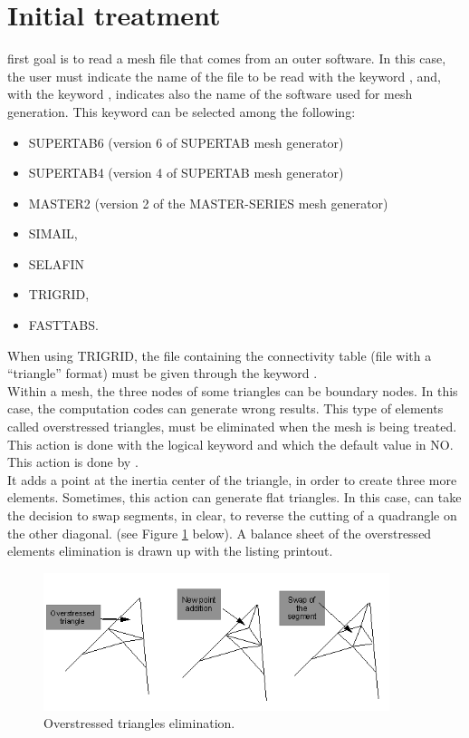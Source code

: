 \section{Initial treatment}
\stbtel first goal is to read a mesh file that comes from an outer software. In
this case, the user must indicate the name of the file to be read with the
keyword , and, with the keyword ,
indicates also the name of the software used for mesh generation. This keyword
can be selected among the following:
\begin{itemize}
\item SUPERTAB6 (version 6 of  SUPERTAB mesh generator)
\item SUPERTAB4 (version 4 of  SUPERTAB mesh generator)
\item MASTER2 (version 2 of the MASTER-SERIES mesh generator)
\item SIMAIL,
\item SELAFIN
\item TRIGRID,
\item FASTTABS.
\end{itemize}
When using TRIGRID, the file containing the connectivity table (file with a
“triangle” format) must be given through the keyword .\\
Within a mesh, the three nodes of some triangles can be boundary nodes. In this
case, the computation codes can generate wrong results. This type of elements
called overstressed triangles, must be eliminated when the mesh is being
treated. This action is done with the logical keyword  and which the default value in NO. This action is done
by \stbtel.\\
It adds a point at the inertia center of the triangle, in order to
create three more elements. Sometimes, this action can generate flat triangles.
In this case, \stbtel can take the decision to swap segments, in clear, to
reverse the cutting of a quadrangle on the other diagonal. (see Figure
\ref{fig:stress} below). A balance sheet of the overstressed elements
elimination is drawn up with the listing printout.

\begin{figure}[H]%
\begin{center}
%
  \includegraphics[width=0.9\textwidth]{./graphics/stress}
%
\end{center}
\caption
{Overstressed triangles elimination.}
\label{fig:stress}
\end{figure}



